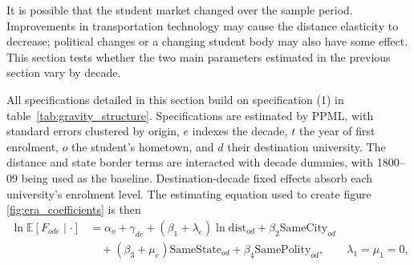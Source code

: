 \documentclass[11pt]{article}
\newcommand{\tabledir}{../output/tables}
\begin{document}
\begin{table}[htbp]
  \ttabbox
  {\caption{Baseline specifications, estimating the structure of the German student market in 1800--48 using a gravity model. Model (1) presents a standard gravity model with a $\log$(distance) term and dummies for same-state and same-polity (essentially same-province) origin-destination pairs. The recovered distance elasticity is similar to the value found in papers studying the modern student market; the very large ``same state'' coefficient indicates that political boundaries were very important in shaping the student market. \\
   Specification (2) decomposes the ``same state'' effect, examining whether it is driven by the state border itself or religious homophily. A student's religion is inferred from the regionally dominant confession (see caveat in text), giving four categories: a student attending a university of the same confession in the same state, same confession in a different state, different confession in the same state, or different confession in a different state. The ``same confession, same state'' category, by far the most common, is omitted. The results of this analysis show that political boundaries are far more determinative of university choice than confession, and that we cannot reject the hypothesis that, within a state, confession has no effect on university choice. Standard errors for both specifications are clustered at the origin (hometown) level.}
   \label{tab:gravity_structure}}
  {}
\end{table}

It is possible that the student market changed over the sample period. Improvements in transportation technology may cause the distance elasticity to decrease; political changes or a changing student body may also have some effect. This section tests whether the two main parameters estimated in the previous section vary by decade.

All specifications detailed in this section build on specification (1) in table~\ref{tab:gravity_structure}. Specifications are estimated by PPML, with standard errors clustered by origin, $e$ indexes the decade, $t$ the year of first enrolment, $o$ the student's hometown, and $d$ their destination university. The distance and state border terms are interacted with decade dummies, with 1800--09 being used as the baseline. Destination-decade fixed effects absorb each university's enrolment level. The estimating equation used to create figure \ref{fig:era_coefficients} is then
\begin{equation}
\begin{split}
\ln \mathbb{E}\!\left[F_{ode} \mid \cdot\right]
  &= \alpha_o + \gamma_{de}
   + (\beta_1 + \lambda_e) \ln \mathrm{dist}_{od}
   + \beta_2 \mathrm{SameCity}_{od} \\
  &\quad + (\beta_3 + \mu_e) \mathrm{SameState}_{od}
   + \beta_4 \mathrm{SamePolity}_{od},
   \qquad \lambda_1 = \mu_1 = 0,
\end{split}
\label{eq:gravity_by_decade}
\end{equation}
\end{document}
